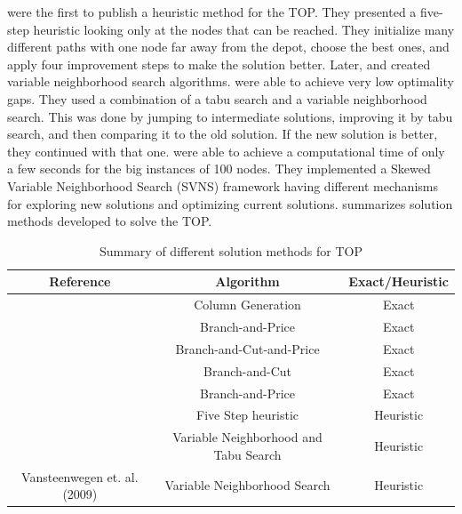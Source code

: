\citet{chao_team_1996} were the first to publish a heuristic method for the TOP. They presented a five-step heuristic looking only at the nodes that can be reached. They initialize many different paths with one node far away from the depot, choose the best ones, and apply four improvement steps to make the solution better. Later, \citet{archetti_metaheuristics_2007} and \citet{vansteenwegen_iterated_2009} created variable neighborhood search algorithms. \citet{archetti_metaheuristics_2007} were able to achieve very low optimality gaps. They used a combination of a tabu search and a variable neighborhood search. This was done by jumping to intermediate solutions, improving it by tabu search, and then comparing it to the old solution. If the new solution is better, they continued with that one. \citet{vansteenwegen_iterated_2009} were able to achieve a computational time of only a few seconds for the big instances of 100 nodes. They implemented a Skewed Variable Neighborhood Search (SVNS) framework having different mechanisms for exploring new solutions and optimizing current solutions.  summarizes solution methods developed to solve the TOP.
\\
\begin{table}[H]
    \centering
    \caption{Summary of different solution methods for TOP}
    \begin{tabular}{ c c c } 
         \hline
             Reference & Algorithm & Exact/Heuristic \\ 
        \hline
             \citet{butt_optimal_1999} & Column Generation & Exact \\ 
             \citet{boussier_exact_2007} & Branch-and-Price & Exact \\
             \citet{poggi_team_2010} & Branch-and-Cut-and-Price & Exact \\ 
             \citet{dang_effective_2013} & Branch-and-Cut & Exact \\ 
             \citet{keshtkaran_enhanced_2016} & Branch-and-Price & Exact \\ 
             \citet{chao_team_1996} & Five Step heuristic & Heuristic \\ 
             \citet{archetti_metaheuristics_2007} & Variable Neighborhood and Tabu Search & Heuristic \\ 
             Vansteenwegen et. al. (2009) & Variable Neighborhood Search & Heuristic \\ 
        \hline
    \end{tabular}
    \label{fig:ComparisonSolutionTOP}
\end{table}

